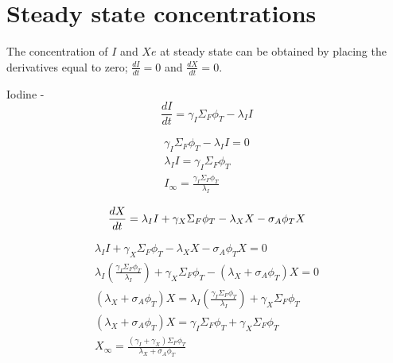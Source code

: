 \documentclass[11pt,a4paper]{article}
\begin{document}
\newpage

\section{Steady state concentrations}
The concentration of $I$ and $Xe$ at steady state can be obtained by placing the derivatives equal to zero; $\frac{dI}{dt} = 0$ and $\frac{dX}{dt} = 0$.

Iodine - 
\begin{equation} \label{eq-i-dq}
        \frac{dI}{dt}=\gamma_I \Sigma_F \phi_T-\lambda_I I
\end{equation}

\begin{equation} \label{eq-i-dq}
    \begin{gathered}
        \gamma_I \Sigma_F \phi_T-\lambda_I I = 0 \\
        \lambda_I I = \gamma_I \Sigma_F \phi_T \\
        I_{\infty} = \frac{\gamma_I \Sigma_F \phi_T}{\lambda_I}
    \end{gathered}
\end{equation}


\begin{equation} \label{eq-xe-dq}
        \frac{dX}{dt}=\lambda_I I + \gamma_X \Sigma_F \phi_T - \lambda_X X - \sigma_A \phi_T X \\
\end{equation}

\begin{equation} \label{eq-xe-dq}
    \begin{gathered}
        \lambda_I I + \gamma_X \Sigma_F \phi_T - \lambda_X X - \sigma_A \phi_T X = 0 \\
        \lambda_I (\frac{\gamma_I \Sigma_F \phi_T}{\lambda_I})+\gamma_X \Sigma_F \phi_T-(\lambda_X + \sigma_A\phi_T) X = 0 \\
        (\lambda_X + \sigma_A\phi_T) X = \lambda_I (\frac{\gamma_I \Sigma_F \phi_T}{\lambda_I})+\gamma_X \Sigma_F \phi_T \\
        (\lambda_X + \sigma_A\phi_T) X = \gamma_I \Sigma_F \phi_T+\gamma_X \Sigma_F \phi_T \\
        X_{\infty} = \frac{(\gamma_I+\gamma_X)\Sigma_F\phi_T}{\lambda_X + \sigma_A\phi_T}
    \end{gathered}
\end{equation}
\end{document}
